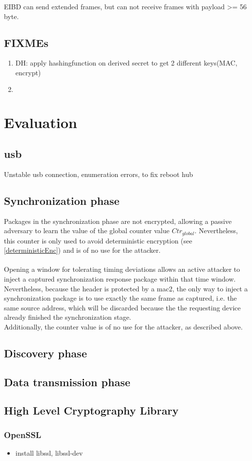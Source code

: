EIBD can send extended frames, but can not receive frames with payload >= 56 byte. 

\subsection{FIXMEs}

\begin{enumerate}
 \item DH: apply hashingfunction on derived secret to get 2 different keys(MAC, encrypt)
 \item 
\end{enumerate}



\section{Evaluation}

\subsection{\gls{usb}}
Unstable \gls{usb} connection, enumeration errors, to fix reboot hub

\subsection{Synchronization phase}
Packages in the synchronization phase are not encrypted, allowing a passive adversary to learn the value of the global counter value $Ctr_{global}$. Nevertheless,
this counter is only used to avoid deterministic encryption (see \ref{deterministicEnc}) and is of no use for the attacker.
\\
\\
Opening a window for tolerating timing deviations allows an active attacker to inject a captured synchronization response package within that time window.
Nevertheless, because the header is protected by a \gls{mac2}, the only way to inject a synchronization package is to use exactly the same frame as captured,
i.e. the same source address, which will be discarded because the the requesting device already finished the synchronization stage.
\\
Additionally, the counter value is of no use for the attacker, as described above.

\subsection{Discovery phase}

\subsection{Data transmission phase}


\subsection{High Level Cryptography Library}

\subsubsection{OpenSSL}

\begin{itemize}
 \item install libssl, libssl-dev
\end{itemize}

